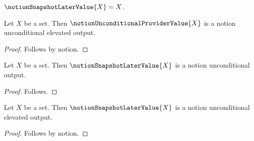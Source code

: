 

\begin{definition}\label{notion_snapshot_later_value}
    $\notionSnapshotLaterValue{X}=X$.
\end{definition}

\begin{proposition}\label{notion_snapshot_prime}
    Let $X$ be a set.
    Then $\notionUnconditionalProviderValue{X}$ is a notion unconditional elevated output.
\end{proposition}
\begin{proof}
    Follows by notion.
\end{proof}

\begin{classification}\label{notion_snapshot_new_registration}
    Let $X$ be a set.
    Then $\notionSnapshotLaterValue{X}$ is a notion unconditional output.
\end{classification}
\begin{proof}
    Follows.
\end{proof}

\begin{proposition}\label{notion_snapshot_observes_new_registration}
    Let $X$ be a set.
    Then $\notionSnapshotLaterValue{X}$ is a notion unconditional elevated output.
\end{proposition}
\begin{proof}
    Follows by notion.
\end{proof}
